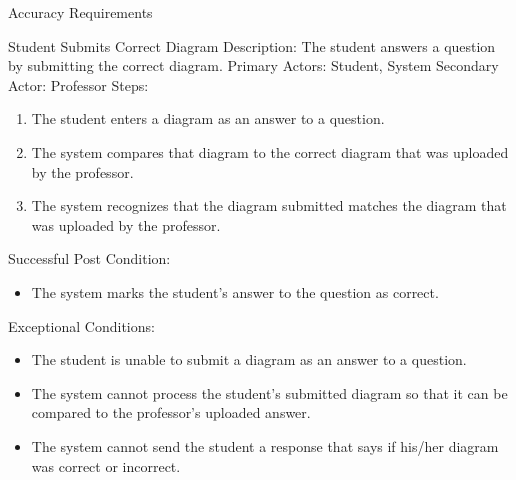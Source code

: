 \documentclass{article}
\begin{document}
\begin{section}{Accuracy Requirements}

\begin{subsection}{Student Submits Correct Diagram}
Description: The student answers a question by submitting the correct diagram. \newline
Primary Actors: Student, System \newline
Secondary Actor: Professor \newline
Steps:
\begin{enumerate}
\item{The student enters a diagram as an answer to a question.}
\item{The system compares that diagram to the correct diagram that was uploaded by the professor.}
\item{The system recognizes that the diagram submitted matches the diagram that was uploaded by the professor.}
\end{enumerate}
Successful Post Condition:
\begin{itemize}
\item{The system marks the student’s answer to the question as correct.} 
\end{itemize}
Exceptional Conditions:
\begin{itemize}
\item{The student is unable to submit a diagram as an answer to a question.}
\item{The system cannot process the student’s submitted diagram so that it can be compared to the professor’s uploaded answer.}
\item{The system cannot send the student a response that says if his/her diagram was correct or incorrect.}
\end{itemize}
\end{subsection}


\end{section}
\end{document}
